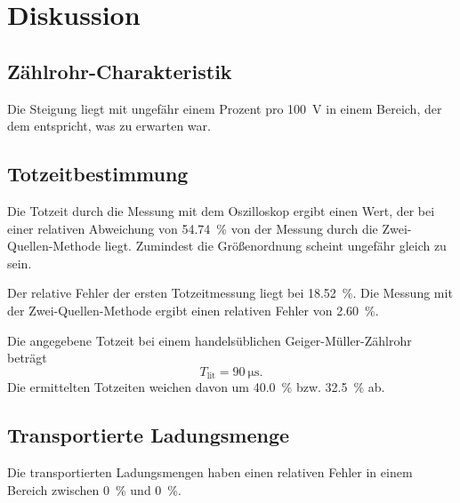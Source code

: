 \section{Diskussion}
\label{sec:Diskussion}

\subsection{Zählrohr-Charakteristik}

Die Steigung liegt mit ungefähr einem Prozent pro \SI{100}{\volt} in einem Bereich, der dem entspricht, was zu erwarten war. %

\subsection{Totzeitbestimmung}

Die Totzeit durch die Messung mit dem Oszilloskop ergibt einen Wert, der bei einer relativen Abweichung von \SI{54.74}{\percent} von der Messung durch die Zwei-Quellen-Methode liegt. 
Zumindest die Größenordnung scheint ungefähr gleich zu sein. 

\noindent Der relative Fehler der ersten Totzeitmessung liegt bei \SI{18.52}{\percent}. Die Messung mit der Zwei-Quellen-Methode ergibt einen relativen Fehler von \SI{2.60}{\percent}.

\noindent Die angegebene Totzeit bei einem handelsüblichen Geiger-Müller-Zählrohr \cite{vergleich} beträgt
\begin{equation*}
    T_\text{lit} = \SI{90}{\micro\second}.
\end{equation*}
Die ermittelten Totzeiten weichen davon um \SI{40.0}{\percent} bzw. \SI{32.5}{\percent} ab.

\subsection{Transportierte Ladungsmenge}

Die transportierten Ladungsmengen haben einen relativen Fehler in einem Bereich zwischen \SI{0}{\percent} und \SI{0}{\percent}. %